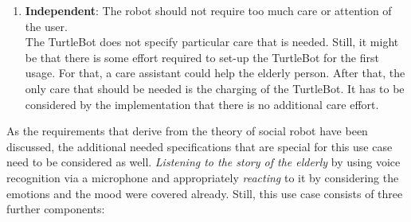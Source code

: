 \documentclass[plainarticle,zihtitle,english,final,hyperref,utf8]{zihpub}
\begin{document}
\begin{enumerate}
    \item \textbf{Independent}: The robot should not require too much care or attention of the user.\\
    \newline
    The TurtleBot does not specify particular care that is needed. Still, it might be that there is some effort required to set-up the TurtleBot for the first usage. For that, a care assistant could help the elderly person. After that, the only care that should be needed is the charging of the TurtleBot. It has to be considered by the implementation that there is no additional care effort.
\end{enumerate}

\bigskip
{}
\bigskip
As the requirements that derive from the theory of social robot have been discussed, the additional needed specifications that are special for this use case need to be considered as well.
\textit{Listening to the story of the elderly} by using voice recognition via a microphone and appropriately \textit{reacting} to it by considering the emotions and the mood were covered already. Still, this use case consists of three further components:
\end{document}
